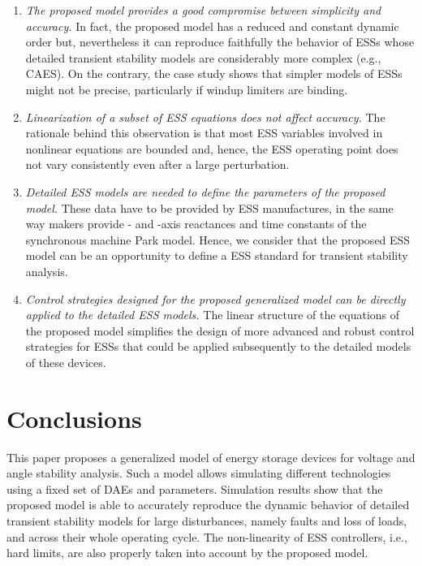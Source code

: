 \documentclass[journal, a4paper]{IEEEtran}
\begin{document}
\begin{enumerate}
\item \textit{The proposed model provides a good compromise bet\-ween
    simplicity and accuracy.} In fact, the proposed model has a
  reduced and constant dynamic order but, nevertheless it can
  reproduce faithfully the behavior of ESSs whose detailed
  transient stability models are
  considerably more complex (e.g., CAES).  On the contrary, the case
  study shows that simpler models of ESSs might not be precise,
  particularly if windup limiters are binding.
\item \textit{Linearization of a subset of ESS equations does not
  affect accuracy.}  The rationale behind this observation is that
  most ESS variables involved in nonlinear equations are bounded
  and, hence, the ESS operating point does not vary consistently even
  after a large perturbation.
\item \textit{Detailed ESS models are needed to define the para\-meters
  of the proposed model.}  These data have to be provided by ESS
  manufactures, in the same way makers provide - and -axis
  reactances and time constants of the synchronous machine Park model.
  Hence, we consider that the proposed ESS model can be an opportunity
  to define a ESS standard for transient stability analysis.
\item \textit{Control strategies designed for the proposed generalized model
	can be directly applied to the detailed ESS models.} The linear structure of
	the equations of the proposed model simplifies the design of more advanced 
	and robust control strategies for ESSs that could be applied subsequently
	to the detailed models of these devices.
\end{enumerate}



\section{Conclusions}
\label{sec:conclu}

This paper proposes a generalized model of energy storage devices for
voltage and angle stability analysis.  Such a model allows simulating
different technologies using a fixed set of DAEs and parameters.
Simulation results show that the proposed model is able to accurately
reproduce the dynamic behavior of detailed transient
stability models for large disturbances, namely faults
and loss of loads, and across their whole operating cycle. 
The non-linearity of ESS controllers, i.e., hard
limits, are also properly taken into account by the proposed model.
\end{document}
